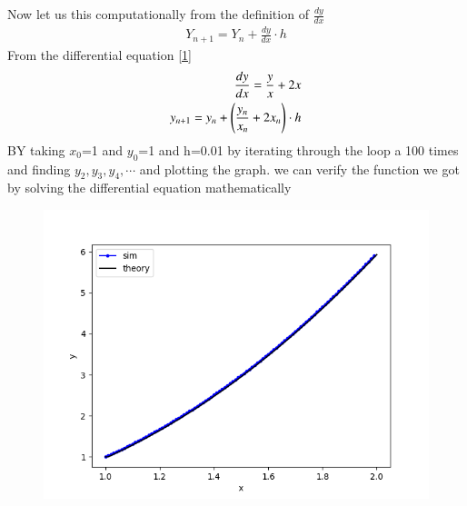 \documentclass[journal]{IEEEtran}
\numberwithin{equation}{enumi}
\numberwithin{figure}{enumi}
\begin{document}
Now let us  this computationally from the definition of $\frac{dy}{dx}$ 
\begin{align}
    Y_{n+1}=Y_n+\frac{dy}{dx}\cdot h
\end{align}
From the differential equation \ref{1}
\begin{align}
    \frac{dy}{dx}=\frac{y}{x}+2x\\
    y_{n+1}=y_n+ \left(\frac{y_n}{x_n}+2x_n\right)\cdot h
\end{align}
BY taking $x_0$=1 and $y_0$=1 and h=0.01  by iterating through the loop a 100 times and finding $y_2,y_3,y_4,\cdots$ and plotting the graph. we can verify the function we got by solving the differential equation mathematically
\begin{figure}[!ht]
    \centering
    \includegraphics[width=\columnwidth]{figs/Figure_1.png}
    \caption{}
\end{figure}
\end{document}
